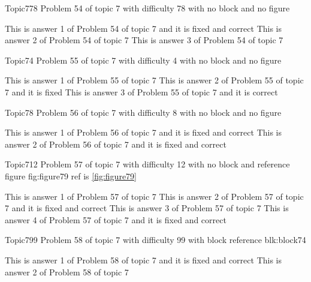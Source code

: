 \documentclass[master]{exam}
\begin{document}
\begin{problem}{Topic7}{78}
	Problem 54 of topic 7 with difficulty 78 with no block and no figure
	\begin{answers}
		 This is answer 1 of Problem 54 of topic 7 and it is fixed and correct
		\answer This is answer 2 of Problem 54 of topic 7 
		\answer This is answer 3 of Problem 54 of topic 7 
	\end{answers}
\end{problem}

\begin{problem}{Topic7}{4}
	Problem 55 of topic 7 with difficulty 4 with no block and no figure
	\begin{answers}
		\answer This is answer 1 of Problem 55 of topic 7 
		\answer[fixed] This is answer 2 of Problem 55 of topic 7 and it is fixed
		\answer[correct] This is answer 3 of Problem 55 of topic 7 and it is correct
	\end{answers}
\end{problem}

\begin{problem}{Topic7}{8}
	Problem 56 of topic 7 with difficulty 8 with no block and no figure
	\begin{answers}
		 This is answer 1 of Problem 56 of topic 7 and it is fixed and correct
		 This is answer 2 of Problem 56 of topic 7 and it is fixed and correct
	\end{answers}
\end{problem}

\begin{problem}{Topic7}{12}
	Problem 57 of topic 7 with difficulty 12 with no block and reference figure fig:figure79 ref is \ref{fig:figure79}
	\begin{answers}
		\answer This is answer 1 of Problem 57 of topic 7 
		 This is answer 2 of Problem 57 of topic 7 and it is fixed and correct
		\answer This is answer 3 of Problem 57 of topic 7 
		 This is answer 4 of Problem 57 of topic 7 and it is fixed and correct
	\end{answers}
\end{problem}

\begin{problem}[requires=blk:block74]{Topic7}{99}
	Problem 58 of topic 7 with difficulty 99 with block reference blk:block74
	\begin{answers}
		 This is answer 1 of Problem 58 of topic 7 and it is fixed and correct
		\answer This is answer 2 of Problem 58 of topic 7 
	\end{answers}
\end{problem}
\end{document}
